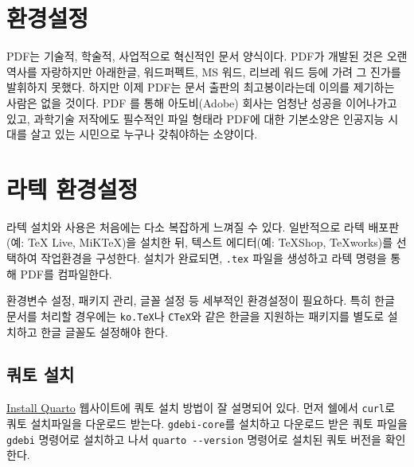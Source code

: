 \documentclass[
  letterpaper,
]{book}
\newenvironment{Shaded}{\begin{snugshade}}{\end{snugshade}}
\newcommand{\AttributeTok}[1]{\textcolor[rgb]{0.40,0.45,0.13}{#1}}
\newcommand{\ExtensionTok}[1]{\textcolor[rgb]{0.00,0.23,0.31}{#1}}
\newcommand{\NormalTok}[1]{\textcolor[rgb]{0.00,0.23,0.31}{#1}}
\begin{document}
\hypertarget{uxd658uxacbduxc124uxc815}{%
\section{환경설정}\label{uxd658uxacbduxc124uxc815}}

PDF는 기술적, 학술적, 사업적으로 혁신적인 문서 양식이다. PDF가 개발된
것은 오랜 역사를 자랑하지만 아래한글, 워드퍼펙트, MS 워드, 리브레 워드
등에 가려 그 진가를 발휘하지 못했다. 하지만 이제 PDF는 문서 출판의
최고봉이라는데 이의를 제기하는 사람은 없을 것이다. PDF 를 통해
아도비(Adobe) 회사는 엄청난 성공을 이어나가고 있고, 과학기술 저작에도
필수적인 파일 형태라 PDF에 대한 기본소양은 인공지능 시대를 살고 있는
시민으로 누구나 갖춰야하는 소양이다.

\hypertarget{uxb77cuxd14d-uxd658uxacbduxc124uxc815}{%
\section{라텍 환경설정}\label{uxb77cuxd14d-uxd658uxacbduxc124uxc815}}

라텍 설치와 사용은 처음에는 다소 복잡하게 느껴질 수 있다. 일반적으로
라텍 배포판(예: TeX Live, MiKTeX)을 설치한 뒤, 텍스트 에디터(예:
TeXShop, TeXworks)를 선택하여 작업환경을 구성한다. 설치가 완료되면,
\texttt{.tex} 파일을 생성하고 라텍 명령을 통해 PDF를 컴파일한다.

환경변수 설정, 패키지 관리, 글꼴 설정 등 세부적인 환경설정이 필요하다.
특히 한글 문서를 처리할 경우에는 \texttt{ko.TeX}나 \texttt{CTeX}와 같은
한글을 지원하는 패키지를 별도로 설치하고 한글 글꼴도 설정해야 한다.

\hypertarget{uxcffcuxd1a0-uxc124uxce58-2}{%
\subsection{쿼토 설치}\label{uxcffcuxd1a0-uxc124uxce58-2}}

\href{https://docs.posit.co/resources/install-quarto/}{Install Quarto}
웹사이트에 쿼토 설치 방법이 잘 설명되어 있다. 먼저 쉘에서
\texttt{curl}로 쿼토 설치파일을 다운로드 받는다. \texttt{gdebi-core}를
설치하고 다운로드 받은 쿼토 파일을 \texttt{gdebi} 명령어로 설치하고 나서
\texttt{quarto\ -\/-version} 명령어로 설치된 쿼토 버전을 확인한다.

\begin{Shaded}
\end{Shaded}
\end{document}
